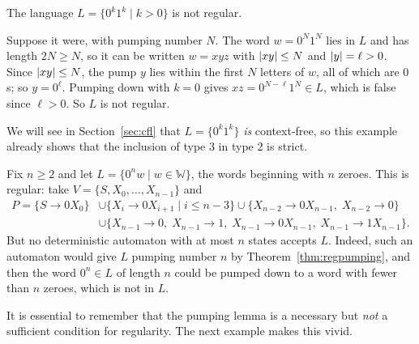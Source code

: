 \documentclass[a4paper]{scrartcl}
\newcommand{\WW}{\mathbb{W}}
\begin{document}
\begin{example}\label{ex:0k1knotregular}
	The language $L = \{0^k1^k \mid k > 0\}$ is not regular.

	Suppose it were, with pumping number $N$. The word $w = 0^N1^N$ lies in $L$ and has length $2N \geq N$, so it can be written $w = xyz$ with $\lvert xy\rvert \leq N$ and $\lvert y\rvert = \ell > 0$. Since $\lvert xy\rvert \leq N$, the pump $y$ lies within the first $N$ letters of $w$, all of which are $0$s; so $y = 0^\ell$. Pumping down with $k = 0$ gives $xz = 0^{N - \ell}1^N \in L$, which is false since $\ell > 0$. So $L$ is not regular.
\end{example}

We will see in Section~\ref{sec:cfl} that $L = \{0^k1^k\}$ \emph{is} context-free, so this example already shows that the inclusion of type 3 in type 2 is strict.

\begin{example}\label{ex:needstates}
	Fix $n \geq 2$ and let $L = \{0^n w \mid w \in \WW\}$, the words beginning with $n$ zeroes. This is regular: take $V = \{S, X_0, \dots, X_{n-1}\}$ and
	\begin{align*}
		P = \{S \to 0X_0\} &\cup \{X_i \to 0X_{i+1} \mid i \leq n - 3\} \cup \{X_{n-2} \to 0X_{n-1},\; X_{n-2} \to 0\} \\
		&\cup \{X_{n-1} \to 0,\; X_{n-1} \to 1,\; X_{n-1} \to 0X_{n-1},\; X_{n-1} \to 1X_{n-1}\}.
	\end{align*}
	But no deterministic automaton with at most $n$ states accepts $L$. Indeed, such an automaton would give $L$ pumping number $n$ by Theorem~\ref{thm:regpumping}, and then the word $0^n \in L$ of length $n$ could be pumped down to a word with fewer than $n$ zeroes, which is not in $L$.
\end{example}

It is essential to remember that the pumping lemma is a necessary but \emph{not} a sufficient condition for regularity. The next example makes this vivid.
\end{document}
